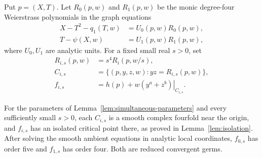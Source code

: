Put \(p=(X,T)\).  Let \(R_0(p,w)\) and \(R_1(p,w)\) be the monic
degree-four Weierstrass polynomials in the graph equations
\begin{align*}
 X-T^2-q_1(T,w)&=U_0(p,w)R_0(p,w),\\
 T-\psi(X,w)&=U_1(p,w)R_1(p,w),
\end{align*}
where \(U_0,U_1\) are analytic units.  For a fixed small real \(s>0\),
set
\begin{align*}
 R_{i,s}(p,w)&=s^4R_i(p,w/s),\\
 C_{i,s}&=\{(p,y,z,w):yz=R_{i,s}(p,w)\},\\
 f_{i,s}&=\left.h(p)+w(y^a+z^b)\right|_{C_{i,s}} .
\end{align*}

\begin{proposition}
\label{prop:ambient-orders}
For the parameters of Lemma~\ref{lem:simultaneous-parameters}
and every sufficiently small \(s>0\), each \(C_{i,s}\) is a smooth
complex fourfold near the origin, and \(f_{i,s}\) has an isolated
critical point there, as proved in Lemma~\ref{lem:isolation}. After solving the smooth ambient equations
in analytic local coordinates, \(f_{0,s}\) has order five and
\(f_{1,s}\) has order four. Both are reduced convergent germs.
\end{proposition}

